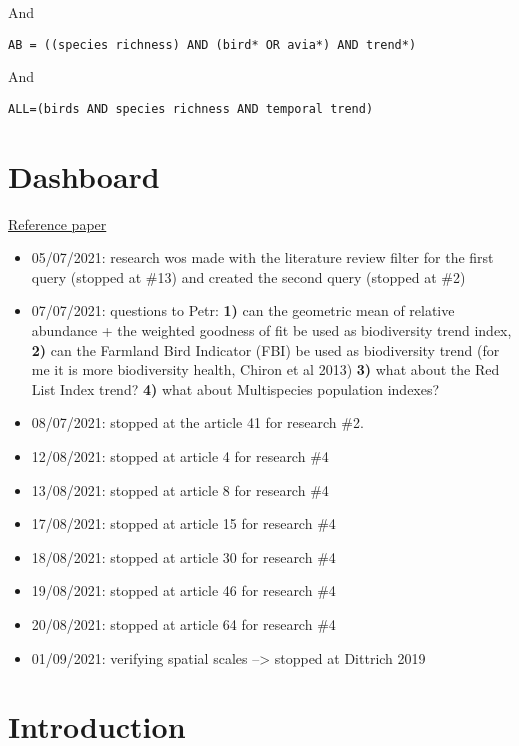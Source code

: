 \documentclass[
  12pt,
  oneside]{report}
\begin{document}
And

\begin{verbatim}
AB = ((species richness) AND (bird* OR avia*) AND trend*) 
\end{verbatim}

And

\begin{verbatim}
ALL=(birds AND species richness AND temporal trend)
\end{verbatim}

\hypertarget{dashboard}{%
\chapter*{Dashboard}\label{dashboard}}

\href{https://www.sciencedirect.com/science/article/pii/S1470160X20306658?via\%3Dihub}{Reference paper}

\begin{itemize}
\item
  05/07/2021: research wos made with the literature review filter for the first query (stopped at \#13) and created the second query (stopped at \#2)
\item
  07/07/2021: questions to Petr: \textbf{1)} can the geometric mean of relative abundance + the weighted goodness of fit be used as biodiversity trend index, \textbf{2)} can the Farmland Bird Indicator (FBI) be used as biodiversity trend (for me it is more biodiversity health, Chiron et al 2013) \textbf{3)} what about the Red List Index trend? \textbf{4)} what about Multispecies population indexes?
\item
  08/07/2021: stopped at the article 41 for research \#2.
\item
  12/08/2021: stopped at article 4 for research \#4
\item
  13/08/2021: stopped at article 8 for research \#4
\item
  17/08/2021: stopped at article 15 for research \#4
\item
  18/08/2021: stopped at article 30 for research \#4
\item
  19/08/2021: stopped at article 46 for research \#4
\item
  20/08/2021: stopped at article 64 for research \#4
\item
  01/09/2021: verifying spatial scales --\textgreater{} stopped at Dittrich 2019
\end{itemize}

\hypertarget{introduction}{%
\chapter{Introduction}\label{introduction}}
\end{document}
